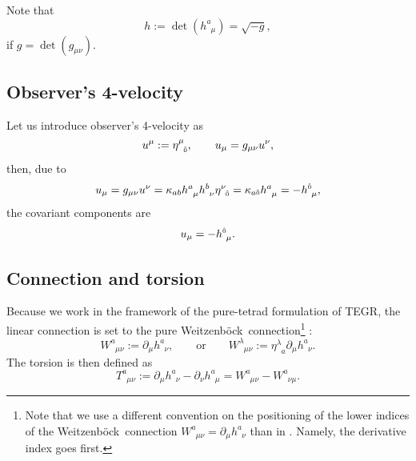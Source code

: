 \documentclass[
10pt, %
a4paper, %
oneside, %
headinclude,footinclude, %
BCOR5mm, %
]{scrartcl}
\newcommand{\pd}[1]{\partial_{#1}}
\newcommand{\mg}[1]{\kappa_{#1}}			%
\newcommand{\tetrsymbol}{h}
\newcommand{\itetrsymbol}{\eta}
\newcommand{\itetr}[2]{\itetrsymbol^{#1}_{\phantom{#1}#2}}
\newcommand{\tetr}[2]{\tetrsymbol^{#1}_{\phantom{#1}#2}}
\newcommand{\detTetr}{\tetrsymbol}
\newcommand{\D}[1]{\partial_{#1}} %
\newcommand{\Tors}[2]{T^{#1}_{\phantom{a}#2}}
\newcommand{\w}[2]{W^{#1}_{\phantom{#1}#2}}
\newcommand{\We}{Weitzenb\"ock}
\newcommand{\KD}[2]{\delta^{\ #1}_{#2}}
\newcommand{\indalg}[1]{\hat{\mathsmaller{#1}}}
\newcommand{\ho}[1]{\textcolor{magenta}{HO: #1}}
\begin{document}

Note that 
\begin{equation}\label{eqn.det}
	\detTetr := \det(\tetr{a}{\mu}) = \sqrt{-g},
\end{equation}
if $ g = \det(g_{\mu\nu}) $.

\subsection{Observer's 4-velocity}

Let us introduce observer's 4-velocity as
\begin{equation}\label{eqn.4v}
	u^\mu := \itetr{\mu}{\indalg{0}}, \qquad u_\mu = g_{\mu\nu}u^\nu,
\end{equation}
then, due to
\begin{equation}
	u_\mu = g_{\mu\nu} u^\nu = \mg{ab}\tetr{a}{\mu}\tetr{b}{\nu}\itetr{\nu}{\indalg{0}} = 
	\mg{a\indalg{0}}\tetr{a}{\mu} = -\tetr{\indalg{0}}{\mu},
\end{equation}\label{eqn.4v.cov}
the covariant components are
\begin{equation}
	u_\mu = -\tetr{\indalg{0}}{\mu}.
\end{equation}
%




\subsection{Connection and torsion}

Because we work in the framework of the pure-tetrad formulation of TEGR, the linear connection 
is set to the pure \We\ connection\footnote{Note that we use a different convention on the 
positioning of the lower indices of the \We\ connection $ \w{a}{\mu\nu} = \pd{\mu}\tetr{a}{\nu} $ 
than in \cite{AldrovandiPereiraBook}. Namely, the derivative index goes first.} 
\cite{AldrovandiPereiraBook,KleinertMultivalued}: 
\begin{equation}\label{eqn.We}
	\w{a}{\mu\nu} := \pd{\mu}\tetr{a}{\nu}, 
	\qquad
	\text{or}
	\qquad
	\w{\lambda}{\mu\nu} := \itetr{\lambda}{a}\pd{\mu}\tetr{a}{\nu}.
\end{equation}
The torsion is then defined as
\begin{equation}\label{eqn.def.tors}
\Tors{a}{\mu\nu}:=\D{\mu}\tetr{a}{\nu} - \D{\nu}\tetr{a}{\mu} = 
\w{a}{\mu\nu} - \w{a}{\nu\mu}.
\end{equation}
\end{document}
